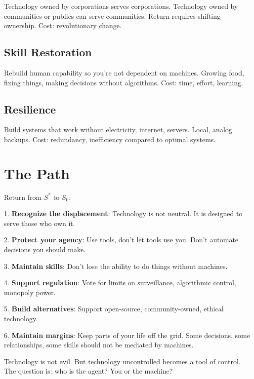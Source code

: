 \documentclass[12pt]{article}
\begin{document}
Technology owned by corporations serves corporations. Technology owned by communities or publics can serve communities. Return requires shifting ownership. Cost: revolutionary change.

\subsection{Skill Restoration}

Rebuild human capability so you're not dependent on machines. Growing food, fixing things, making decisions without algorithms. Cost: time, effort, learning.

\subsection{Resilience}

Build systems that work without electricity, internet, servers. Local, analog backups. Cost: redundancy, inefficiency compared to optimal systems.

\section{The Path}

Return from $S^*$ to $S_0$:

1. \textbf{Recognize the displacement}: Technology is not neutral. It is designed to serve those who own it.

2. \textbf{Protect your agency}: Use tools, don't let tools use you. Don't automate decisions you should make.

3. \textbf{Maintain skills}: Don't lose the ability to do things without machines.

4. \textbf{Support regulation}: Vote for limits on surveillance, algorithmic control, monopoly power.

5. \textbf{Build alternatives}: Support open-source, community-owned, ethical technology.

6. \textbf{Maintain margins}: Keep parts of your life off the grid. Some decisions, some relationships, some skills should not be mediated by machines.

Technology is not evil. But technology uncontrolled becomes a tool of control. The question is: who is the agent? You or the machine?
\end{document}
